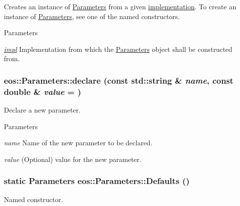Creates an instance of \hyperlink{classeos_1_1Parameters}{Parameters} from a given \hyperlink{namespaceeos_1_1implementation}{implementation}. To create an instance of \hyperlink{classeos_1_1Parameters}{Parameters}, see one of the named constructors.


\begin{DoxyParams}{Parameters}
\item[{\em \hyperlink{namespaceeos_1_1impl}{impl}}]Implementation from which the \hyperlink{classeos_1_1Parameters}{Parameters} object shall be constructed from. \end{DoxyParams}
\hypertarget{classeos_1_1Parameters_adfc224ca93af9276c55c756f6e7e2e18}{
\subsubsection[{declare}]{ eos::Parameters::declare (const std::string \& {\em name}, \/  const double \& {\em value} = {})}}
\label{classeos_1_1Parameters_adfc224ca93af9276c55c756f6e7e2e18}
Declare a new parameter.


\begin{DoxyParams}{Parameters}
\item[{\em name}]Name of the new parameter to be declared. \item[{\em value}](Optional) value for the new parameter. \end{DoxyParams}
\hypertarget{classeos_1_1Parameters_a1fa30b2210827623e6bf9f3ac4d2fd94}{
\subsubsection[{Defaults}]{\setlength{\rightskip}{0pt plus 5cm}static {\bf Parameters} eos::Parameters::Defaults ()}}
\label{classeos_1_1Parameters_a1fa30b2210827623e6bf9f3ac4d2fd94}
Named constructor.

